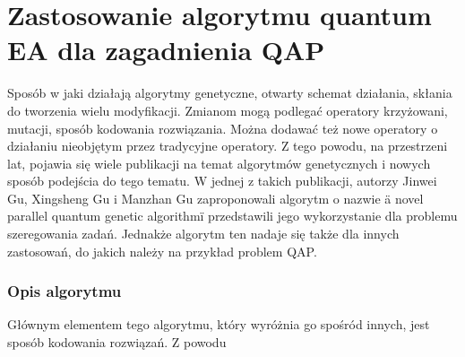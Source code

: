 \chapter{Zastosowanie algorytmu quantum EA dla zagadnienia QAP}
Sposób w jaki działają algorytmy genetyczne, otwarty schemat działania, skłania do tworzenia wielu modyfikacji. Zmianom mogą podlegać operatory krzyżowani, mutacji, sposób kodowania rozwiązania. Można dodawać też nowe operatory o działaniu nieobjętym przez tradycyjne operatory. Z tego powodu, na przestrzeni lat, pojawia się wiele publikacji na temat algorytmów genetycznych i nowych sposób podejścia do tego tematu. W jednej z takich publikacji, autorzy Jinwei Gu, Xingsheng Gu i Manzhan Gu zaproponowali algorytm o nazwie \" a novel parallel quantum genetic algorithm\" i przedstawili jego wykorzystanie dla problemu szeregowania zadań. Jednakże algorytm ten nadaje się także dla innych zastosowań, do jakich należy na przykład problem QAP.

\subsection{Opis algorytmu}
Głównym elementem tego algorytmu, który wyróżnia go spośród innych, jest sposób kodowania rozwiązań. Z powodu  

\label{cha:qap_ea}